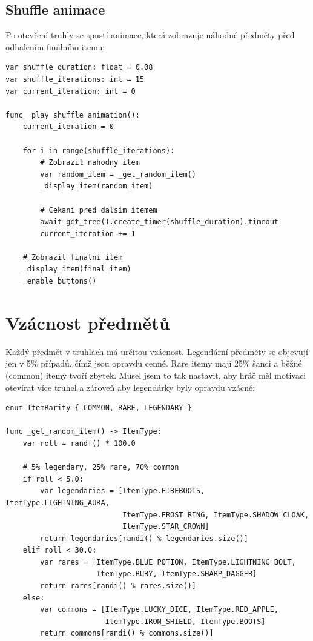 \documentclass[12pt, a4paper,
oneside
]{report}
\begin{document}
	\subsection{Shuffle animace}
	
	Po otevření truhly se spustí animace, která zobrazuje náhodné předměty před odhalením finálního itemu:
	
\begin{lstlisting}[style=GDScript, caption={Shuffle animace v chest UI}]
var shuffle_duration: float = 0.08
var shuffle_iterations: int = 15
var current_iteration: int = 0

func _play_shuffle_animation():
	current_iteration = 0
	
	for i in range(shuffle_iterations):
		# Zobrazit nahodny item
		var random_item = _get_random_item()
		_display_item(random_item)
		
		# Cekani pred dalsim itemem
		await get_tree().create_timer(shuffle_duration).timeout
		current_iteration += 1
	
	# Zobrazit finalni item
	_display_item(final_item)
	_enable_buttons()
\end{lstlisting}

	\section{Vzácnost předmětů}
	\nopagebreak
	
	Každý předmět v truhlách má určitou vzácnost. Legendární předměty se objevují jen v 5\% případů, čímž jsou opravdu cenné. Rare itemy mají 25\% šanci a běžné (common) itemy tvoří zbytek. Musel jsem to tak nastavit, aby hráč měl motivaci otevírat více truhel a zároveň aby legendárky byly opravdu vzácné:
	\nopagebreak
	
\begin{lstlisting}[style=GDScript, caption={Systém vzácnosti}]
enum ItemRarity { COMMON, RARE, LEGENDARY }

func _get_random_item() -> ItemType:
	var roll = randf() * 100.0
	
	# 5% legendary, 25% rare, 70% common
	if roll < 5.0:
		var legendaries = [ItemType.FIREBOOTS, ItemType.LIGHTNING_AURA, 
		                   ItemType.FROST_RING, ItemType.SHADOW_CLOAK, 
		                   ItemType.STAR_CROWN]
		return legendaries[randi() % legendaries.size()]
	elif roll < 30.0:
		var rares = [ItemType.BLUE_POTION, ItemType.LIGHTNING_BOLT, 
		             ItemType.RUBY, ItemType.SHARP_DAGGER]
		return rares[randi() % rares.size()]
	else:
		var commons = [ItemType.LUCKY_DICE, ItemType.RED_APPLE, 
		               ItemType.IRON_SHIELD, ItemType.BOOTS]
		return commons[randi() % commons.size()]
\end{lstlisting}
\end{document}
